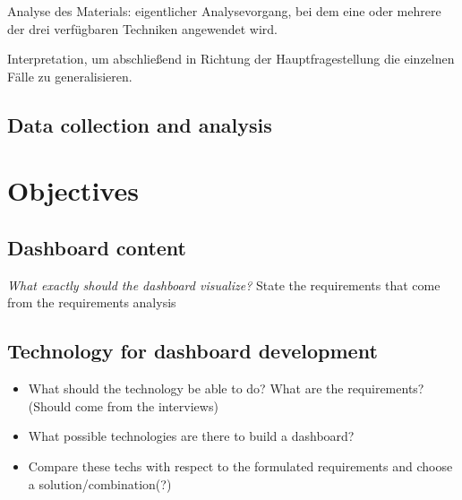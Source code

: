 Analyse des Materials: eigentlicher Analysevorgang, bei dem eine oder mehrere der drei verfügbaren Techniken angewendet wird.

Interpretation, um abschließend in Richtung der Hauptfragestellung die einzelnen Fälle zu generalisieren.

\subsection{Data collection and analysis}

\section{Objectives}

\subsection{Dashboard content}
\textit{What exactly should the dashboard visualize?}
State the requirements that come from the requirements analysis

\subsection{Technology for dashboard development}
\begin{itemize}
    \item What should the technology be able to do? What are the requirements? (Should come from the interviews)
    \item What possible technologies are there to build a dashboard? 
    \item Compare these techs with respect to the formulated requirements and choose a solution/combination(?)
\end{itemize}

